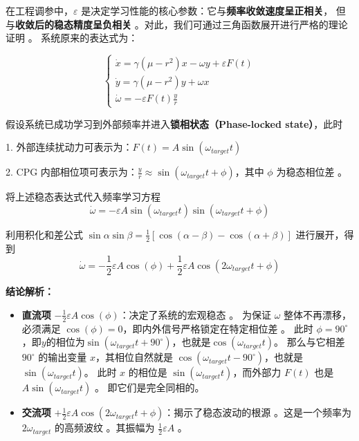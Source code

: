 \documentclass[12pt, a4paper]{ctexart}
\begin{document}
在工程调参中，$\varepsilon$ 是决定学习性能的核心参数：它与\textbf{频率收敛速度呈正相关}，
但与\textbf{收敛后的稳态精度呈负相关} 。对此，我们可通过三角函数展开进行严格的理论证明 。
系统原来的表达式为：

\begin{equation}
    \begin{cases}
        \dot{x} = \gamma(\mu - r^2)x - \omega y + \varepsilon F(t) \\
        \dot{y} = \gamma(\mu - r^2)y + \omega x \\
        \dot{\omega} = -\varepsilon F(t) \frac{y}{r}
    \end{cases}
\end{equation}

假设系统已成功学习到外部频率并进入\textbf{锁相状态（Phase-locked state）}，此时

1. 外部连续扰动力可表示为：$F(t) = A \sin(\omega_{target} t)$
 
2. CPG 内部相位项可表示为：$\frac{y}{r} \approx \sin(\omega_{target} t + \phi)$，其中 $\phi$ 为稳态相位差 。

将上述稳态表达式代入频率学习方程 
\begin{equation}
    \dot{\omega} = -\varepsilon A \sin(\omega_{target} t) \sin(\omega_{target} t + \phi)
\end{equation}

利用积化和差公式 $\sin\alpha\sin\beta = \frac{1}{2}[\cos(\alpha-\beta) - \cos(\alpha+\beta)]$ 进行展开，得到 
\begin{equation}
    \dot{\omega} = -\frac{1}{2} \varepsilon A \cos(\phi) + \frac{1}{2} \varepsilon A \cos(2\omega_{target} t + \phi)
\end{equation}

\textbf{结论解析：}
\begin{itemize}
    \item \textbf{直流项} $-\frac{1}{2} \varepsilon A \cos(\phi)$：决定了系统的宏观稳态 。
    为保证 $\omega$ 整体不再漂移，必须满足 $\cos(\phi) = 0$，即内外信号严格锁定在特定相位差 。
    此时 $\phi = 90^\circ$ ，即$y$的相位为$\sin(\omega_{target} t + 90^\circ)$，也就是$\cos(\omega_{target} t)$。
    那么与它相差 $90^\circ$ 的输出变量 $x$，其相位自然就是 $\cos(\omega_{target} t - 90^\circ)$，也就是 $\sin(\omega_{target} t)$。
    此时 $x$ 的相位是 $\sin(\omega_{target} t)$，而外部力 $F(t)$ 也是 $A \sin(\omega_{target} t)$ 。
    即它们是完全同相的。
    \item \textbf{交流项} $+\frac{1}{2} \varepsilon A \cos(2\omega_{target} t + \phi)$：揭示了稳态波动的根源 。这是一个频率为 $2\omega_{target}$ 的高频波纹 。其振幅为 $\frac{1}{2} \varepsilon A$ 。
\end{itemize}
\end{document}
